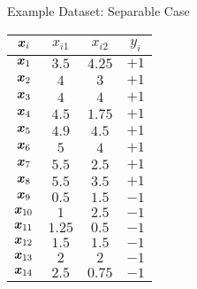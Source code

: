 \begin{frame}{Example Dataset: Separable Case}
\renewcommand{\arraystretch}{1.1}
\begin{center}
\begin{tabular}{|c|c|c|c|}
        \hline
        ${\boldsymbol x}_i$ & $x_{i1}$ & $x_{i2}$ & $y_i$\\
        \hline
        ${\boldsymbol x}_1$ & $3.5$ & $4.25$ & $+1$\\
        ${\boldsymbol x}_2$ & $4$ & $3$ & $+1$\\
        ${\boldsymbol x}_3$ & $4$ & $4$ & $+1$\\
        ${\boldsymbol x}_4$ & $4.5$ & $1.75$ & $+1$\\
        ${\boldsymbol x}_5$ & $4.9$ & $4.5$ & $+1$\\
        ${\boldsymbol x}_6$ & $5$ & $4$ & $+1$\\
        ${\boldsymbol x}_7$ & $5.5$ & $2.5$ & $+1$\\
        ${\boldsymbol x}_8$ & $5.5$ & $3.5$ & $+1$\\
        ${\boldsymbol x}_9$ & $0.5$ & $1.5$ & $-1$\\
        ${\boldsymbol x}_{10}$ & $1$ & $2.5$ & $-1$\\
        ${\boldsymbol x}_{11}$ & $1.25$ & $0.5$ & $-1$\\
        ${\boldsymbol x}_{12}$ & $1.5$ & $1.5$ & $-1$\\
        ${\boldsymbol x}_{13}$ & $2$ & $2$ & $-1$\\
        ${\boldsymbol x}_{14}$ & $2.5$ & $0.75$ & $-1$\\
        \hline
    \end{tabular}%
\end{center}
\end{frame}

